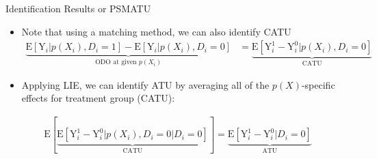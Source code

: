 \documentclass[hyperref={pdfpagelabels=false}]{beamer}
\begin{document}
\begin{frame}{Identification Results or PSM}{ATU}
	\begin{itemize}
		
		\item Note that using a matching method, we can also identify CATU
		\vspace{0.2cm}
		\begin{equation*}
			\begin{aligned}
				\underbrace{\mathrm{E}[\mathrm{Y}_{i}|p(X_{i}),D_{i}=1] - \mathrm{E}[\mathrm{Y}_{i}|p(X_{i}),D_{i}=0]}_{\text{ODO at given $p(X_{i})$}} &= \underbrace{\mathrm{E}[\mathrm{Y}^{1}_{i}-\mathrm{Y}^{0}_{i}|p(X_{i}),D_i=0]}_{\text{CATU}}
			\end{aligned}
		\end{equation*}	
		
		
		\item Applying LIE, we can identify ATU by averaging all of the $p(X)$-specific effects for treatment group (CATU):
		\vspace{0.2cm}
		
	\end{itemize}
	\begin{equation*}
		\begin{aligned}
			\mathrm{E}[\underbrace{\mathrm{E}[\mathrm{Y}^{1}_{i}-\mathrm{Y}^{0}_{i}|p(X_{i}),D_i=0 |D_i=0]}_{\text{CATU}}] 
			=\underbrace{\mathrm{E}[\mathrm{Y}^{1}_{i}-\mathrm{Y}^{0}_{i}|D_i=0]}_{\text{ATU}}
			
		\end{aligned}
	\end{equation*}	
	
\end{frame}
\end{document}

